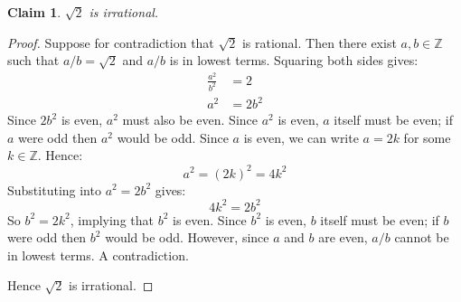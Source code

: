 \documentclass{article}
\newtheorem*{claim}{Claim}
\begin{document}
\begin{claim}
    $\sqrt{2}$ is irrational.
\end{claim}

\begin{proof}
    Suppose for contradiction that $\sqrt{2}$ is rational. Then there exist $a, b \in \mathbb{Z}$ such that 
    $a/b = \sqrt{2}$ and $a/b$ is in lowest terms. Squaring both sides gives:
    \[
    \begin{aligned}
    \frac{a^2}{b^2} &= 2 \\
    a^2 &= 2b^2
    \end{aligned}
    \]
    Since $2b^2$ is even, $a^2$ must also be even. Since $a^2$ is even, $a$ itself must be even; if $a$ were 
    odd then $a^2$ would be odd. Since $a$ is even, we can write $a = 2k$ for some $k \in \mathbb{Z}$. Hence:
    \[
    a^2 = (2k)^2 = 4k^2
    \]
    Substituting into $a^2 = 2b^2$ gives:
    \[
    4k^2 = 2b^2
    \]
    So $b^2 = 2k^2$, implying that $b^2$ is even. Since $b^2$ is even, $b$ itself must be even; if $b$ were 
    odd then $b^2$ would be odd. However, since $a$ and $b$ are even, $a/b$ cannot be in lowest terms. A 
    contradiction.

    \medskip

    Hence $\sqrt{2}$ is irrational.
\end{proof}
\end{document}
